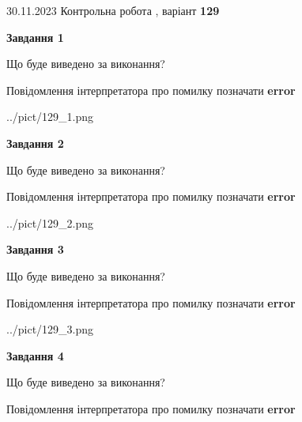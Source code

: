 \documentclass[12pt, ukrainian]{article}
\begin{document}
{{30.11.2023 Контрольна робота , варіант  \No \textbf { 129 }\par}}
{




{\begin {center}\textbf{Завдання 1}\end {center}}\par
Що буде виведено за виконання? \par
Повідомлення інтерпретатора про помилку позначати \textbf{error}

\begin{center}
	{../pict/129_1.png}
\end{center}
\newpage

{\begin {center}\textbf{Завдання 2}\end {center}}\par
Що буде виведено за виконання? \par
Повідомлення інтерпретатора про помилку позначати \textbf{error}

\begin{center}
	{../pict/129_2.png}
\end{center}
\newpage

{\begin {center}\textbf{Завдання 3}\end {center}}\par
Що буде виведено за виконання? \par
Повідомлення інтерпретатора про помилку позначати \textbf{error}

\begin{center}
	{../pict/129_3.png}
\end{center}
\newpage

{\begin {center}\textbf{Завдання 4}\end {center}}\par
Що буде виведено за виконання? \par
Повідомлення інтерпретатора про помилку позначати \textbf{error}

}
\end{document}
